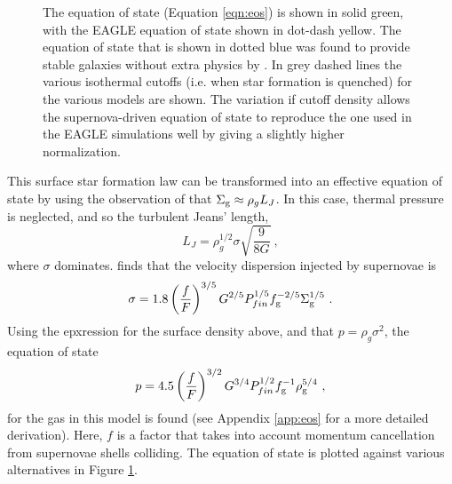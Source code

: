 \begin{figure}
    \leavevmode\rlap{\usebox{\graphicsbox}}
    \begin{minipage}[b]{0.42\wd\graphicsbox}
    {\caption{The equation of state (Equation \ref{eqn:eos}) is shown in solid green, with the EAGLE equation of state shown in dot-dash yellow. The equation of state that is shown in dotted blue was found to provide stable galaxies without extra physics by \citep{springel_cosmological_2003}. In grey dashed lines the various isothermal cutoffs (i.e. when star formation is quenched) for the various models are shown. The variation if cutoff density allows the supernova-driven equation of state to reproduce the one used in the EAGLE simulations well by giving a slightly higher normalization.}\label{fig:eos}}
\end{minipage}\hspace*{1\wd\graphicsbox}
\end{figure}

This surface star formation law can be transformed into an effective equation of state by using the observation of \citet{schaye_model-independent_2001} that $\Sigma_\mathrm{g} \approx \rho_g L_J$.
In this case, thermal pressure is neglected, and so the turbulent Jeans' length,
\begin{equation}
\label{eqn:jeans}
L_J = \rho_g^{1/2} \sigma \sqrt{\frac{9}{8G}}~,
\end{equation}
where $\sigma$ dominates.
\citet{martizzi_supernova_2015} finds that the velocity dispersion injected by supernovae is
\begin{equation}
\label{eqn:martdisp}
\sigma = 1.8 \left(\frac{f}{F}\right)^{{3/5}} G^{{2/5}} P_{fin}^{{1/5}} f_\mathrm{g}^{{-2/5}} \Sigma_\mathrm{g}^{{1/5}}~.
\end{equation}
Using the epxression for the surface density above, and that $p = \rho_g \sigma^2$, the equation of state
\begin{equation}
\label{eqn:eos}
p = 4.5\left(\frac{f}{F}\right)^{{3/2}} G^{{3/4}} P_{fin}^{{1/2}} f_\mathrm{g}^{-1} \rho_\mathrm{g}^{{5/4}}~,
\end{equation}
for the gas in this model is found (see Appendix \ref{app:eos} for a more detailed derivation).
Here, $f$ is a factor that takes into account momentum cancellation from supernovae shells colliding.
The equation of state is plotted against various alternatives in Figure \ref{fig:eos}.
